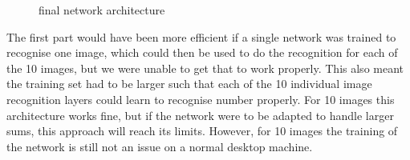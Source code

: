 \documentclass[a4paper,12pt]{article}
\begin{document}
\begin{figure}[H]
\hfill
{}
\hfill
\caption{final network architecture}
\label{arch}
\end{figure}

The first part would have been more efficient if a single network was trained to recognise one image, which could then be used to do the recognition for each of the 10 images, but we were unable to get that to work properly. This also meant the training set had to be larger such that each of the 10 individual image recognition layers could learn to recognise number properly. For 10 images this architecture works fine, but if the network were to be adapted to handle larger sums, this approach will reach its limits. However, for 10 images the training of the network is still not an issue on a normal desktop machine.
\end{document}
